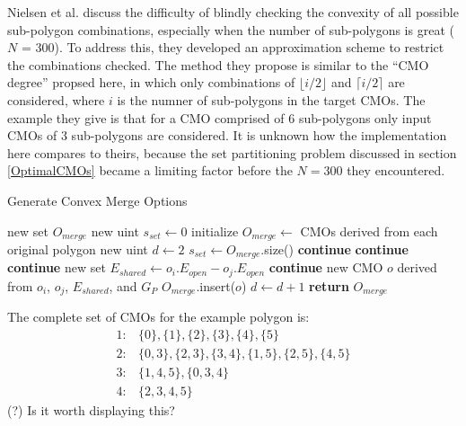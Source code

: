 Nielsen et al. discuss the difficulty of blindly checking the convexity of all possible sub-polygon combinations, especially when the number of sub-polygons is great ($N$ = 300)\cite{IntEdgeExt}.
To address this, they developed an approximation scheme to restrict the combinations checked.
The method they propose is similar to the ``CMO degree'' propsed here, in which only combinations of $\lfloor i/2 \rfloor$ and $\lceil i/2 \rceil$ are considered, where $i$ is the numner of sub-polygons in the target CMOs.
The example they give is that for a CMO comprised of 6 sub-polygons only input CMOs of 3 sub-polygons are considered.
It is unknown how the implementation here compares to theirs, because the set partitioning problem discussed in section \ref{OptimalCMOs} became a limiting factor before the $N=300$ they encountered.

\begin{algorithm}[!hb]
\caption{Generate Convex Merge Options}\label{alg:generate_CMOs}
\begin{algorithmic}[1]
	\State new set $O_{merge}$ 
	\State new uint $s_{set} \leftarrow 0$ 
	\State initialize $O_{merge} \leftarrow$ CMOs derived from each original polygon
	\State new uint $d \leftarrow 2$ 
		\State $s_{set} \leftarrow O_{merge}$.size()
					\State \textbf{continue}
				\EndIf
					\State \textbf{continue}
				\EndIf
					\State \textbf{continue}
				\EndIf
				\State new set $E_{shared} \leftarrow o_i$.$E_{open} - o_j$.$E_{open}$
					\State \textbf{continue}
				\EndIf
				\State new CMO $o$ derived from $o_i$, $o_j$, $E_{shared}$, and $G_P$
				\State $O_{merge}$.insert($o$)
			\EndFor
		\EndFor
		\State $d \leftarrow d + 1$
	\EndWhile
	\State \textbf{return} $O_{merge}$
\EndFunction
\end{algorithmic}
\end{algorithm}

The complete set of CMOs for the example polygon is:
\[
\begin{split}
	1:& \{0\},\{1\},\{2\},\{3\},\{4\},\{5\}\\
	2:& \{0,3\},\{2,3\},\{3,4\},\{1,5\},\{2,5\},\{4,5\}\\
	3:& \{1,4,5\},\{0,3,4\}\\
	4:& \{2,3,4,5\}
\end{split}
\]
(?) Is it worth displaying this?

